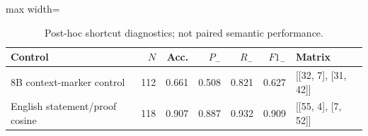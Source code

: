 \begin{table}[htbp]
\centering
\caption{Post-hoc shortcut diagnostics; not paired semantic performance.}
\label{tab:simple-controls}
\small
\begin{adjustbox}{max width=\textwidth}
\begin{tabular}{lrrrrrl}
\toprule
Control & $N$ & Acc. & $P_-$ & $R_-$ & $F1_-$ & Matrix \\
\midrule
8B context-marker control & 112 & 0.661 & 0.508 & 0.821 & 0.627 & [[32, 7], [31, 42]] \\
English statement/proof cosine & 118 & 0.907 & 0.887 & 0.932 & 0.909 & [[55, 4], [7, 52]] \\
\bottomrule
\end{tabular}
\end{adjustbox}
\end{table}
